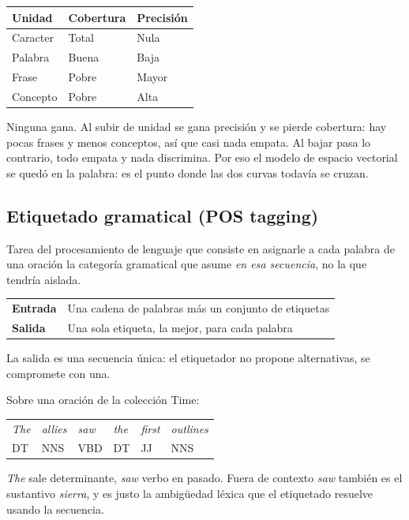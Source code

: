 \documentclass[11pt,letterpaper]{article}
\begin{document}
\begin{center}
\begin{tabular}{lll}
    \toprule
    \textbf{Unidad} & \textbf{Cobertura} & \textbf{Precisión} \\
    \midrule
    Caracter  & Total    & Nula \\
    Palabra   & Buena    & Baja \\
    Frase     & Pobre    & Mayor \\
    Concepto  & Pobre    & Alta \\
    \bottomrule
\end{tabular}
\end{center}

\begin{idea}
    Ninguna gana. Al subir de unidad se gana precisión y se pierde
    cobertura: hay pocas frases y menos conceptos, así que casi nada
    empata. Al bajar pasa lo contrario, todo empata y nada discrimina.
    Por eso el modelo de espacio vectorial se quedó en la palabra: es
    el punto donde las dos curvas todavía se cruzan.
\end{idea}

\subsection*{Etiquetado gramatical (POS tagging)}

Tarea del procesamiento de lenguaje que consiste en asignarle a cada
palabra de una oración la categoría gramatical que asume \emph{en esa
secuencia}, no la que tendría aislada.

\begin{center}
\begin{tabular}{ll}
    \toprule
    \textbf{Entrada} & Una cadena de palabras más un conjunto de
                       etiquetas \\
    \textbf{Salida}  & Una sola etiqueta, la mejor, para cada palabra \\
    \bottomrule
\end{tabular}
\end{center}

La salida es una secuencia única: el etiquetador no propone
alternativas, se compromete con una.

\begin{ejemplo}
    Sobre una oración de la colección Time:
    \begin{center}
    \begin{tabular}{llllll}
        \toprule
        \textit{The} & \textit{allies} & \textit{saw} &
        \textit{the} & \textit{first} & \textit{outlines} \\
        DT & NNS & VBD & DT & JJ & NNS \\
        \bottomrule
    \end{tabular}
    \end{center}
    \textit{The} sale determinante, \textit{saw} verbo en pasado.
    Fuera de contexto \textit{saw} también es el sustantivo
    \textit{sierra}, y es justo la ambigüedad léxica que el etiquetado
    resuelve usando la secuencia.
\end{ejemplo}
\end{document}
